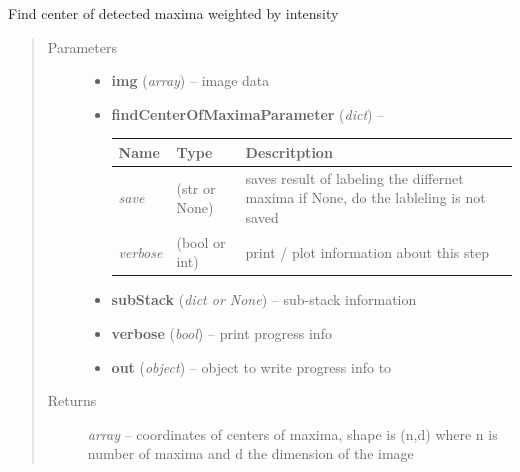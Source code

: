 \documentclass[letterpaper,10pt,english]{sphinxmanual}
\begin{document}
\begin{fulllineitems}
\label{api/ClearMap.ImageProcessing:ClearMap.ImageProcessing.MaximaDetection.findCenterOfMaxima}
Find center of detected maxima weighted by intensity
\begin{quote}\begin{description}
\item[{Parameters}] \leavevmode\begin{itemize}
\item {} 
\textbf{img} (\emph{array}) --
image data

\item {} 
\textbf{findCenterOfMaximaParameter} (\emph{dict}) --

\begin{tabulary}{\linewidth}{|L|L|L|}
\hline
\textsf{\relax 
Name
} & \textsf{\relax 
Type
} & \textsf{\relax 
Descritption
}\\
\hline
\emph{save}
 & 
(str or None)
 & 
saves result of labeling the differnet maxima
if None, do the lableling is not saved
\\
\hline
\emph{verbose}
 & 
(bool or int)
 & 
print / plot information about this step
\\
\hline\end{tabulary}


\item {} 
\textbf{subStack} (\emph{dict or None}) --
sub-stack information

\item {} 
\textbf{verbose} (\emph{bool}) --
print progress info

\item {} 
\textbf{out} (\emph{object}) --
object to write progress info to

\end{itemize}

\item[{Returns}] \leavevmode
\emph{array} --
coordinates of centers of maxima, shape is (n,d) where n is number of maxima and d the dimension of the image

\end{description}\end{quote}

\end{fulllineitems}
\end{document}
